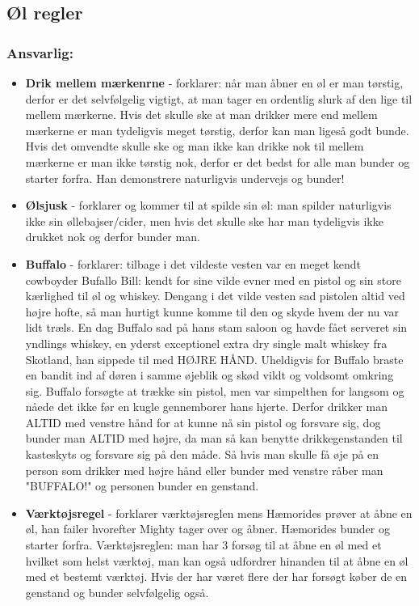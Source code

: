\subsection*{Øl regler}
\subsubsection*{\textbf{Ansvarlig:}  \stive \hemorides \farav \mighty \buddha \randildo}
\begin{itemize}
  \item \textbf{Drik mellem mærkenrne} - \stive forklarer: når man åbner en øl er man tørstig, derfor er det selvfølgelig vigtigt, at man tager en ordentlig slurk af den lige til mellem mærkerne. Hvis det skulle ske at man drikker mere end mellem mærkerne er man tydeligvis meget tørstig, derfor kan man ligeså godt bunde. Hvis det omvendte skulle ske og man ikke kan drikke nok til mellem mærkerne er man ikke tørstig nok, derfor er det bedst for alle man bunder og starter forfra. Han demonstrere naturligvis undervejs og bunder!
  \item \textbf{Ølsjusk} - \hemorides forklarer og kommer til at spilde sin øl: man spilder naturligvis ikke sin øllebajser/cider, men hvis det skulle ske har man tydeligvis ikke drukket nok og derfor bunder man.
  \item \textbf{Buffalo} - \farav forklarer: tilbage i det vildeste vesten var en meget kendt cowboyder Bufallo Bill: kendt for sine vilde evner med en pistol og sin store kærlighed til øl og whiskey. Dengang i det vilde vesten sad pistolen altid ved højre hofte, så man hurtigt kunne komme til den og skyde hvem der nu var lidt træls. En dag Buffalo sad på hans stam saloon og havde fået serveret sin yndlings whiskey, en yderst exceptionel extra dry single malt whiskey fra Skotland, han sippede til med HØJRE HÅND. Uheldigvis for Buffalo braste en bandit ind af døren i samme øjeblik og skød vildt og voldsomt omkring sig. Buffalo forsøgte at trække sin pistol, men var simpelthen for langsom og nåede det ikke før en kugle gennemborer hans hjerte. Derfor drikker man ALTID med venstre hånd for at kunne nå sin pistol og forsvare sig, dog bunder man ALTID med højre, da man så kan benytte drikkegenstanden til kasteskyts og forsvare sig på den måde. Så hvis man skulle få øje på en person som drikker med højre hånd eller bunder med venstre råber man "BUFFALO!" og personen bunder en genstand.
  \item \textbf{Værktøjsregel} - \mighty forklarer værktøjsreglen mens Hæmorides prøver at åbne en øl, han failer hvorefter Mighty tager over og åbner. Hæmorides bunder og starter forfra. Værktøjsreglen: man har 3 forsøg til at åbne en øl med et hvilket som helst værktøj, man kan også udfordrer hinanden til at åbne en øl med et bestemt værktøj. Hvis der har været flere der har forsøgt køber de en genstand og bunder selvfølgelig også.

\end{itemize}
